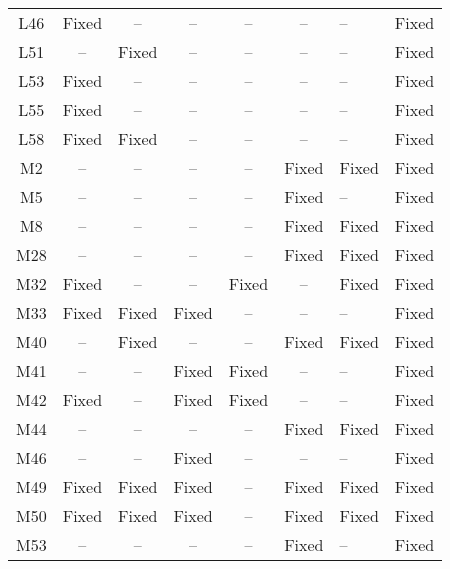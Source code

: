 \begin{table}[!t]
{\begin{tabular}{|c|c|c|c|c|c|}
L46               & Fixed     & --        & --        & --        & --        & --        &Fixed   \\
L51               & --        & Fixed     & --        & --        & --        & --        &Fixed   \\
L53               & Fixed     & --        & --        & --        & --        & --        &Fixed   \\
L55               & Fixed     & --        & --        & --        & --        & --        &Fixed   \\
L58               & Fixed     & Fixed     & --        & --        & --        & --        &Fixed   \\
\hline
M2                & --        & --        & --        & --        & Fixed     & Fixed     &Fixed   \\
M5                & --        & --        & --        & --        & Fixed     & --        &Fixed   \\
M8                & --        & --        & --        & --        & Fixed     & Fixed     &Fixed   \\
M28               & --        & --        & --        & --        & Fixed     & Fixed     &Fixed   \\
M32               & Fixed     & --        & --        & Fixed     & --        & Fixed     &Fixed   \\
M33               & Fixed     & Fixed     & Fixed     & --        & --        & --        &Fixed   \\
M40               & --        & Fixed     & --        & --        & Fixed     & Fixed     &Fixed   \\
M41               & --        & --        & Fixed     & Fixed     & --        & --        &Fixed   \\
M42               & Fixed     & --        & Fixed     & Fixed     & --        & --        &Fixed   \\
M44               & --        & --        & --        & --        & Fixed     & Fixed     &Fixed   \\
M46               & --        & --        & Fixed     & --        & --        & --        &Fixed   \\
M49               & Fixed     & Fixed     & Fixed     & --        & Fixed     & Fixed     &Fixed   \\
M50               & Fixed     & Fixed     & Fixed     & --        & Fixed     & Fixed     &Fixed   \\
M53               & --        & --        & --        & --        & Fixed     & --        &Fixed   \\

\end{tabular}}
\end{table}
